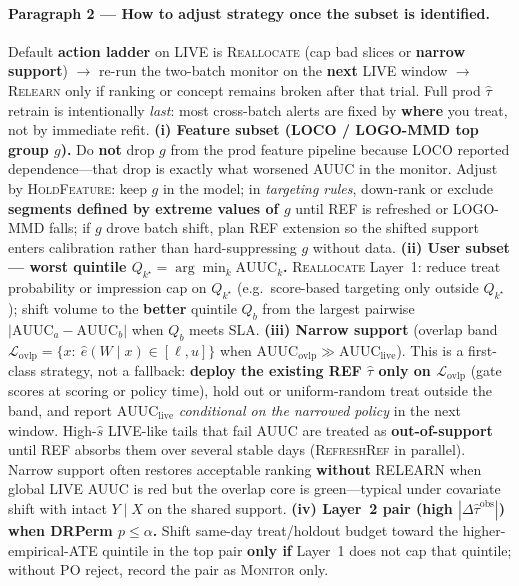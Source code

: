 \paragraph{Paragraph 2 --- How to adjust strategy once the subset is identified.}
Default \textbf{action ladder} on LIVE is \textsc{Reallocate} (cap bad slices or \textbf{narrow support}) $\rightarrow$ re-run the two-batch monitor on the \textbf{next} LIVE window $\rightarrow$ \textsc{Relearn} only if ranking or concept remains broken after that trial.
Full prod $\hat\tau$ retrain is intentionally \emph{last}: most cross-batch alerts are fixed by \textbf{where} you treat, not by immediate refit.
\textbf{(i) Feature subset (LOCO / LOGO-MMD top group $g$).}
Do \textbf{not} drop $g$ from the prod feature pipeline because LOCO reported dependence---that drop is exactly what worsened AUUC in the monitor.
Adjust by \textsc{HoldFeature}: keep $g$ in the model; in \emph{targeting rules}, down-rank or exclude \textbf{segments defined by extreme values of $g$} until REF is refreshed or LOGO-MMD falls; if $g$ drove batch shift, plan REF extension so the shifted support enters calibration rather than hard-suppressing $g$ without data.
\textbf{(ii) User subset --- worst quintile $Q_{k^\star}=\arg\min_k \mathrm{AUUC}_k$.}
\textsc{Reallocate} Layer~1: reduce treat probability or impression cap on $Q_{k^\star}$ (e.g.\ score-based targeting only outside $Q_{k^\star}$); shift volume to the \textbf{better} quintile $Q_b$ from the largest pairwise $|\mathrm{AUUC}_a-\mathrm{AUUC}_b|$ when $Q_b$ meets SLA.
\textbf{(iii) Narrow support} (overlap band $\mathcal{L}_{\mathrm{ovlp}}=\{x:\ \hat e(W\mid x)\in[\ell,u]\}$ when $\mathrm{AUUC}_{\mathrm{ovlp}}\gg \mathrm{AUUC}_{\mathrm{live}}$).
This is a first-class strategy, not a fallback: \textbf{deploy the existing REF $\hat\tau$ only on $\mathcal{L}_{\mathrm{ovlp}}$} (gate scores at scoring or policy time), hold out or uniform-random treat outside the band, and report $\mathrm{AUUC}_{\mathrm{live}}$ \emph{conditional on the narrowed policy} in the next window.
High-$\hat s$ LIVE-like tails that fail AUUC are treated as \textbf{out-of-support} until REF absorbs them over several stable days (\textsc{RefreshRef} in parallel).
Narrow support often restores acceptable ranking \textbf{without} RELEARN when global LIVE AUUC is red but the overlap core is green---typical under covariate shift with intact $Y\mid X$ on the shared support.
\textbf{(iv) Layer~2 pair (high $|\Delta\widehat{\tau}^{\mathrm{obs}}|$) when DRPerm $p\le\alpha$.}
Shift same-day treat/holdout budget toward the higher-empirical-ATE quintile in the top pair \textbf{only if} Layer~1 does not cap that quintile; without PO reject, record the pair as \textsc{Monitor} only.
